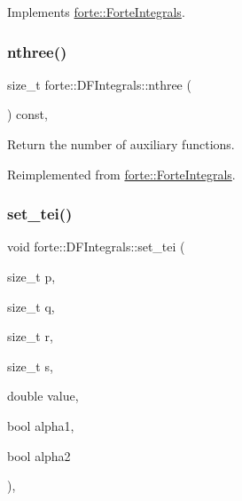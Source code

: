 Implements \mbox{\hyperlink{classforte_1_1_forte_integrals_a7862835fa0f5f9abe13dfcd6730fa4be}{forte\+::\+Forte\+Integrals}}.

\mbox{\label{classforte_1_1_d_f_integrals_ac514e780990cdc0b3b594453eb63e901}} 
\subsubsection{\texorpdfstring{nthree()}{nthree()}}
{\footnotesize\ttfamily size\+\_\+t forte\+::\+D\+F\+Integrals\+::nthree (\begin{DoxyParamCaption}{ }\end{DoxyParamCaption}) const\hspace{0.3cm}{\ttfamily [override]}, {\ttfamily [virtual]}}



Return the number of auxiliary functions. 



Reimplemented from \mbox{\hyperlink{classforte_1_1_forte_integrals_af04858e7813556747745f90ffbda81a4}{forte\+::\+Forte\+Integrals}}.

\mbox{\label{classforte_1_1_d_f_integrals_ac623714d6a85c8f18722aae187b8324e}} 
\subsubsection{\texorpdfstring{set\+\_\+tei()}{set\_tei()}}
{\footnotesize\ttfamily void forte\+::\+D\+F\+Integrals\+::set\+\_\+tei (\begin{DoxyParamCaption}\item[{size\+\_\+t}]{p,  }\item[{size\+\_\+t}]{q,  }\item[{size\+\_\+t}]{r,  }\item[{size\+\_\+t}]{s,  }\item[{double}]{value,  }\item[{bool}]{alpha1,  }\item[{bool}]{alpha2 }\end{DoxyParamCaption})\hspace{0.3cm}{\ttfamily [override]}, {\ttfamily [virtual]}}



